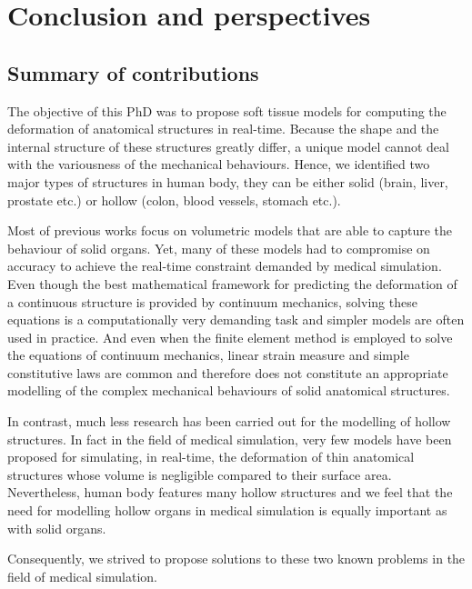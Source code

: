 \chapter{Conclusion and perspectives}
\label{chap11}


\section{Summary of contributions}

The objective of this PhD was to propose soft tissue models for computing the deformation of anatomical structures in real-time. Because the shape and the internal structure of these structures greatly differ, a unique model cannot deal with the variousness of the mechanical behaviours. Hence, we identified two major types of structures in human body, they can be either solid (brain, liver, prostate etc.) or hollow (colon, blood vessels, stomach etc.). 

Most of previous works focus on volumetric models that are able to capture the behaviour of solid organs. Yet, many of these models had to compromise on accuracy to achieve the real-time constraint demanded by medical simulation. Even though the best mathematical framework for predicting the deformation of a continuous structure is provided by continuum mechanics, solving these equations is a computationally very demanding task and simpler models are often used in practice. And even when the finite element method is employed to solve the equations of continuum mechanics, linear strain measure and simple constitutive laws are common and therefore does not constitute an appropriate modelling of the complex mechanical behaviours of solid anatomical structures. 

In contrast, much less research has been carried out for the modelling of hollow structures. In fact in the field of medical simulation, very few models have been proposed for simulating, in real-time, the deformation of thin anatomical structures whose volume is negligible compared to their surface area. Nevertheless, human body features many hollow structures and we feel that the need for modelling hollow organs in medical simulation is equally important as with solid organs. 

\bigskip

Consequently, we strived to propose solutions to these two known problems in the field of medical simulation.

